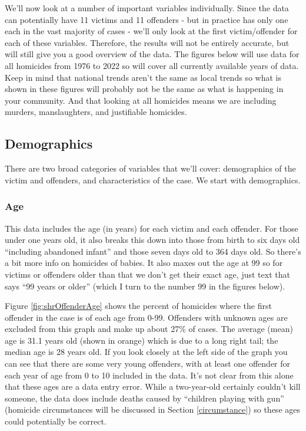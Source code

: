 \documentclass[
]{krantz}
\begin{document}
We'll now look at a number of important variables
individually. Since the data can potentially have 11 victims
and 11 offenders - but in practice has only one each in the
vast majority of cases - we'll only look at the first
victim/offender for each of these variables. Therefore, the
results will not be entirely accurate, but will still give
you a good overview of the data. The figures below will use
data for all homicides from 1976 to 2022 so will cover all
currently available years of data. Keep in mind that
national trends aren't the same as local trends so what is
shown in these figures will probably not be the same as what
is happening in your community. And that looking at all
homicides means we are including murders, manslaughters, and
justifiable homicides.

\subsection{Demographics}\label{demographics}

There are two broad categories of variables that we'll
cover: demographics of the victim and offenders, and
characteristics of the case. We start with demographics.

\subsubsection{Age}\label{age-1}

This data includes the age (in years) for each victim and
each offender. For those under one years old, it also breaks
this down into those from birth to six days old ``including
abandoned infant'' and those seven days old to 364 days old.
So there's a bit more info on homicides of babies. It also
maxes out the age at 99 so for victims or offenders older
than that we don't get their exact age, just text that says
``99 years or older'' (which I turn to the number 99 in the
figures below).

Figure \ref{fig:shrOffenderAge} shows the percent of
homicides where the first offender in the case is of each
age from 0-99. Offenders with unknown ages are excluded from
this graph and make up about 27\% of cases. The average
(mean) age is 31.1 years old (shown in orange) which is due
to a long right tail; the median age is 28 years old. If you
look closely at the left side of the graph you can see that
there are some very young offenders, with at least one
offender for each year of age from 0 to 10 included in the
data. It's not clear from this alone that these ages are a
data entry error. While a two-year-old certainly couldn't
kill someone, the data does include deaths caused by
``children playing with gun'' (homicide circumstances will
be discussed in Section \ref{circumstance}) so these ages
could potentially be correct.
\end{document}
